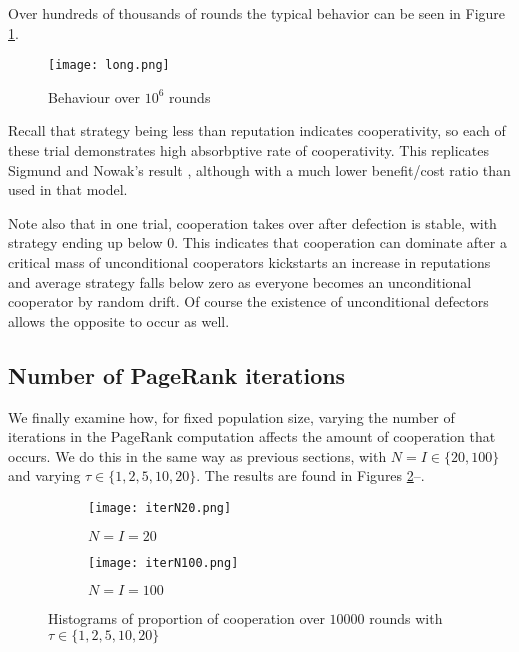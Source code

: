 \documentclass{amsart}
\begin{document}
Over hundreds of thousands of rounds the typical behavior can be
seen in Figure \ref{figure-long}.

\begin{figure}[h!tbp]
  \texttt{[image: long.png]}
  \caption{Behaviour over $10^6$ rounds}
  \label{figure-long}
\end{figure}

Recall that strategy being less than reputation indicates
cooperativity, so each of these trial demonstrates high absorbptive
rate of cooperativity. This replicates Sigmund and Nowak's result
\cite{nowak_evolution_1998}, although with a much lower benefit/cost
ratio than used in that model. 

Note also that in one trial, cooperation takes over after defection is
stable, with strategy ending up below $0$. This indicates that
cooperation can dominate after a critical mass of unconditional
cooperators kickstarts an increase in reputations and average strategy
falls below zero as everyone becomes an unconditional cooperator by
random drift. Of course the existence of unconditional defectors
allows the opposite to occur as well.

\subsection{Number of PageRank iterations}

We finally examine how, for fixed population size, varying the number
of iterations in the PageRank computation affects the amount of
cooperation that occurs. We do this in the same way as previous
sections, with $N=I \in \{20,100\}$ and varying $\tau \in
\{1,2,5,10,20\}$. The results are found in Figures
\ref{figure-iterN20}--.

\begin{figure}[h!tbp]
  \begin{subfigure}{.485\linewidth}
    \texttt{[image: iterN20.png]}
    \caption{$N=I=20$}
    \label{figure-iterN20}
  \end{subfigure}
  \hspace{.01\linewidth}
  \begin{subfigure}{.485\linewidth}
    \texttt{[image: iterN100.png]}
    \caption{$N=I=100$}
    \label{figure-iterN100}
  \end{subfigure}
\caption{Histograms of proportion of cooperation over $10000$
      rounds with $\tau \in \{1,2,5,10,20\}$}
\end{figure}
\end{document}
